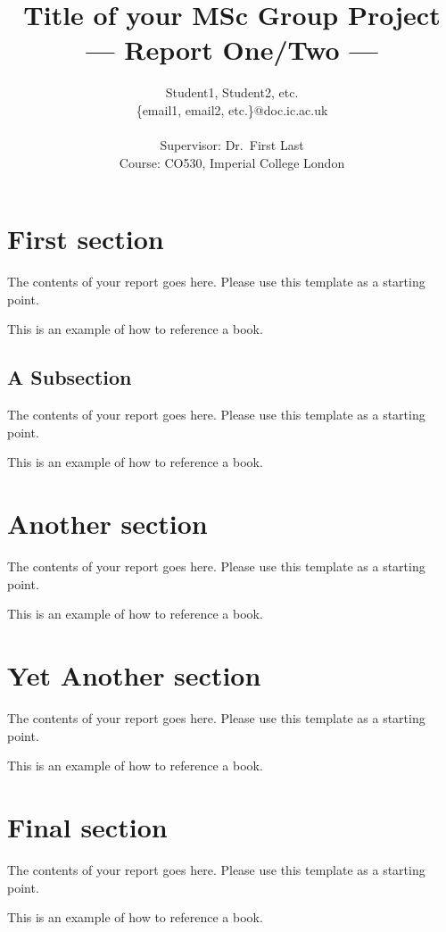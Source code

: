 \documentclass[a4paper,11pt]{article}
\title{Title of your MSc Group Project\\\Large{--- Report One/Two ---}}
\author{Student1, Student2, etc.\\
       \{email1, email2, etc.\}@doc.ic.ac.uk\\ \\
       \small{Supervisor: Dr.\ First Last}\\
       \small{Course: CO530, Imperial College London}
}
\begin{document}
\maketitle

\section{First section}

The contents of your report goes here. Please use this template as a starting
point.

This is an example of how to reference a book\cite{goossens93}.

\subsection{A Subsection}

The contents of your report goes here. Please use this template as a starting
point.

This is an example of how to reference a book\cite{goossens93}.

\section{Another section}

The contents of your report goes here. Please use this template as a starting
point.

This is an example of how to reference a book\cite{goossens93}.

\section{Yet Another section}

The contents of your report goes here. Please use this template as a starting
point.

This is an example of how to reference a book\cite{goossens93}.

\section{Final section}

The contents of your report goes here. Please use this template as a starting
point.

This is an example of how to reference a book\cite{goossens93}.



\end{document}
